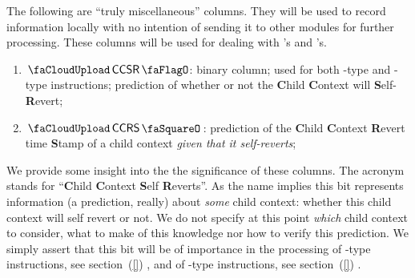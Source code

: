The following are ``truly miscellaneous'' columns. They will be used to record information locally with no intention of sending it to other modules for further processing. These columns will be used for dealing with 's and 's.
\begin{enumerate}[resume]
	\item $\miscChildSelfReverts$:
		binary column; used for both -type and -type instructions; prediction of whether or not the \textbf{C}hild \textbf{C}ontext will \textbf{S}elf-\textbf{R}evert; 
	\item $\miscChildRevertStamp$:
		prediction of the \textbf{C}hild \textbf{C}ontext \textbf{R}evert time \textbf{S}tamp of a child context \emph{given that it self-reverts}; 
\end{enumerate}
We provide some insight into the the significance of these columns.
The acronym \miscChildSelfReverts{} stands for ``\textbf{C}hild \textbf{C}ontext \textbf{S}elf \textbf{R}everts''.
As the name implies this bit represents information (a prediction, really) about \emph{some} child context: whether this child context will self revert or not.
We do not specify at this point \emph{which} child context to consider, what to make of this knowledge nor how to verify this prediction.
We simply assert that this bit will be of importance in the processing of 
-type instructions, see section~(\ref{}) , and of 
-type instructions,   see section~(\ref{}) .
